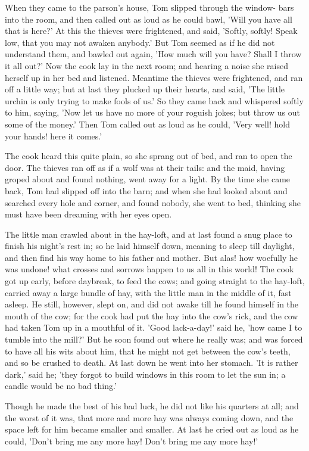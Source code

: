 \documentclass[12pt]{book}
\begin{document}
When they came to the parson's house, Tom slipped through the window-
bars into the room, and then called out as loud as he could bawl,
'Will you have all that is here?' At this the thieves were frightened,
and said, 'Softly, softly! Speak low, that you may not awaken
anybody.' But Tom seemed as if he did not understand them, and bawled
out again, 'How much will you have? Shall I throw it all out?' Now the
cook lay in the next room; and hearing a noise she raised herself up
in her bed and listened. Meantime the thieves were frightened, and ran
off a little way; but at last they plucked up their hearts, and said,
'The little urchin is only trying to make fools of us.' So they came
back and whispered softly to him, saying, 'Now let us have no more of
your roguish jokes; but throw us out some of the money.' Then Tom
called out as loud as he could, 'Very well! hold your hands! here it
comes.'

The cook heard this quite plain, so she sprang out of bed, and ran to
open the door. The thieves ran off as if a wolf was at their tails:
and the maid, having groped about and found nothing, went away for a
light. By the time she came back, Tom had slipped off into the barn;
and when she had looked about and searched every hole and corner, and
found nobody, she went to bed, thinking she must have been dreaming
with her eyes open.

The little man crawled about in the hay-loft, and at last found a snug
place to finish his night's rest in; so he laid himself down, meaning
to sleep till daylight, and then find his way home to his father and
mother. But alas! how woefully he was undone! what crosses and sorrows
happen to us all in this world! The cook got up early, before
daybreak, to feed the cows; and going straight to the hay-loft,
carried away a large bundle of hay, with the little man in the middle
of it, fast asleep. He still, however, slept on, and did not awake
till he found himself in the mouth of the cow; for the cook had put
the hay into the cow's rick, and the cow had taken Tom up in a
mouthful of it. 'Good lack-a-day!' said he, 'how came I to tumble into
the mill?' But he soon found out where he really was; and was forced
to have all his wits about him, that he might not get between the
cow's teeth, and so be crushed to death. At last down he went into her
stomach. 'It is rather dark,' said he; 'they forgot to build windows
in this room to let the sun in; a candle would be no bad thing.'

Though he made the best of his bad luck, he did not like his quarters
at all; and the worst of it was, that more and more hay was always
coming down, and the space left for him became smaller and smaller. At
last he cried out as loud as he could, 'Don't bring me any more hay!
Don't bring me any more hay!'
\end{document}
